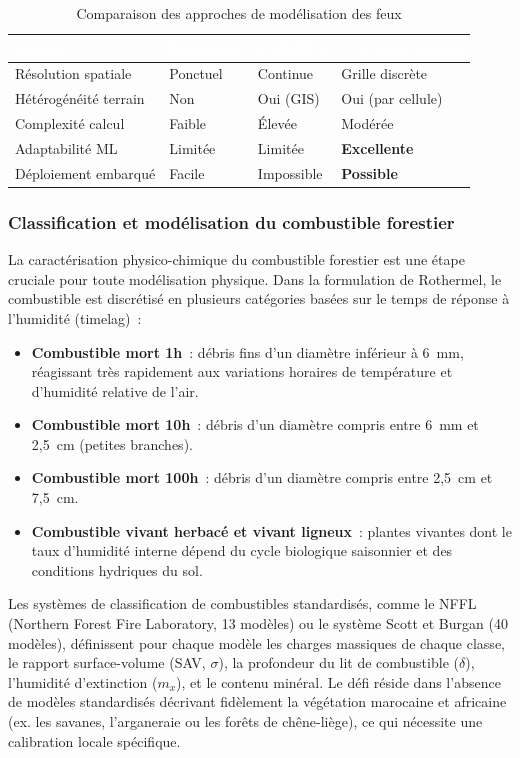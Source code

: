 \documentclass[a4paper,12pt,openany,titlepage]{scrartcl}
\begin{document}
\begin{table}[H]
\centering
\caption{Comparaison des approches de modélisation des feux}
\begin{tabularx}{\textwidth}{|l|X|X|X|}
\hline
\rowcolor{NavyBlue} \textcolor{white}{\textbf{Critère}} & \textcolor{white}{\textbf{Rothermel}} & \textcolor{white}{\textbf{FARSITE}} & \textcolor{white}{\textbf{CA + Rothermel}} \\
\hline
Résolution spatiale & Ponctuel & Continue & Grille discrète \\
\hline
Hétérogénéité terrain & Non & Oui (GIS) & Oui (par cellule) \\
\hline
Complexité calcul & Faible & Élevée & Modérée \\
\hline
Adaptabilité ML & Limitée & Limitée & \textbf{Excellente} \\
\hline
Déploiement embarqué & Facile & Impossible & \textbf{Possible} \\
\hline
\end{tabularx}
\end{table}

\subsubsection{Classification et modélisation du combustible forestier}

La caractérisation physico-chimique du combustible forestier est une étape cruciale pour toute modélisation physique. Dans la formulation de Rothermel, le combustible est discrétisé en plusieurs catégories basées sur le temps de réponse à l'humidité (timelag)~:
\begin{itemize}[nosep]
    \item \textbf{Combustible mort 1h}~: débris fins d'un diamètre inférieur à 6~mm, réagissant très rapidement aux variations horaires de température et d'humidité relative de l'air.
    \item \textbf{Combustible mort 10h}~: débris d'un diamètre compris entre 6~mm et 2,5~cm (petites branches).
    \item \textbf{Combustible mort 100h}~: débris d'un diamètre compris entre 2,5~cm et 7,5~cm.
    \item \textbf{Combustible vivant herbacé et vivant ligneux}~: plantes vivantes dont le taux d'humidité interne dépend du cycle biologique saisonnier et des conditions hydriques du sol.
\end{itemize}

Les systèmes de classification de combustibles standardisés, comme le NFFL (Northern Forest Fire Laboratory, 13 modèles) ou le système Scott et Burgan (40 modèles), définissent pour chaque modèle les charges massiques de chaque classe, le rapport surface-volume (SAV, $\sigma$), la profondeur du lit de combustible ($\delta$), l'humidité d'extinction ($m_x$), et le contenu minéral. Le défi réside dans l'absence de modèles standardisés décrivant fidèlement la végétation marocaine et africaine (ex. les savanes, l'arganeraie ou les forêts de chêne-liège), ce qui nécessite une calibration locale spécifique.
\end{document}
